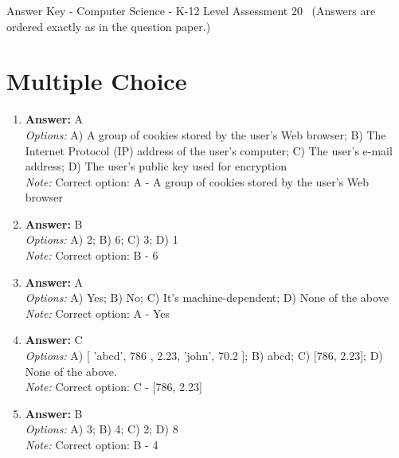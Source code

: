 \documentclass[12pt]{article}
\begin{document}
\begin{center}
Answer Key - Computer Science - K-12 Level Assessment 20 \
\small (Answers are ordered exactly as in the question paper.)
\end{center}

\section*{Multiple Choice}
\begin{enumerate}[label=\arabic*.]
\item \textbf{Answer:} A
\\ \textit{Options:} A) A group of cookies stored by the user's Web browser; B) The Internet Protocol (IP) address of the user's computer; C) The user's e-mail address; D) The user's public key used for encryption
\\ \textit{Note:} Correct option: A - A group of cookies stored by the user's Web browser
\item \textbf{Answer:} B
\\ \textit{Options:} A) 2; B) 6; C) 3; D) 1
\\ \textit{Note:} Correct option: B - 6
\item \textbf{Answer:} A
\\ \textit{Options:} A) Yes; B) No; C) It's machine-dependent; D) None of the above
\\ \textit{Note:} Correct option: A - Yes
\item \textbf{Answer:} C
\\ \textit{Options:} A) [ 'abcd', 786 , 2.23, 'john', 70.2 ]; B) abcd; C) [786, 2.23]; D) None of the above.
\\ \textit{Note:} Correct option: C - [786, 2.23]
\item \textbf{Answer:} B
\\ \textit{Options:} A) 3; B) 4; C) 2; D) 8
\\ \textit{Note:} Correct option: B - 4
\end{enumerate}
\end{document}
